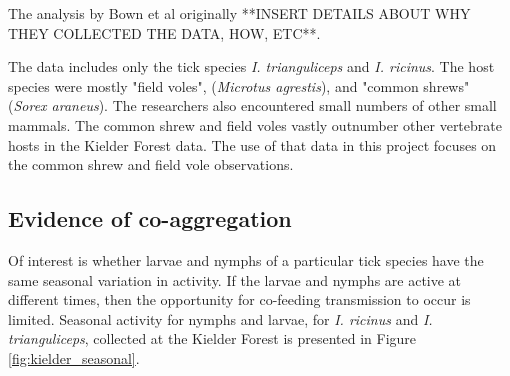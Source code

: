 \documentclass{article}
\begin{document}
The analysis by Bown et al originally **INSERT DETAILS ABOUT WHY THEY COLLECTED THE DATA, HOW, ETC**.

The data includes only the tick species \textit{I. trianguliceps} and  \textit{I. ricinus}. The host species were mostly "field voles", (\textit{Microtus agrestis}), and "common shrews" (\textit{Sorex araneus}). The researchers also encountered small numbers of other small mammals. The common shrew and field voles vastly outnumber other vertebrate hosts in the Kielder Forest data. The use of that data in this project focuses on the common shrew and field vole observations. 

\subsection{Evidence of co-aggregation}

Of interest is whether larvae and nymphs of a particular tick species have the same seasonal variation in activity. If the larvae and nymphs are active at different times, then the opportunity for co-feeding transmission to occur is limited. Seasonal activity for nymphs and larvae, for \textit{I. ricinus} and \textit{I. trianguliceps}, collected at the Kielder Forest is presented in Figure \ref{fig:kielder_seasonal}.
\end{document}
